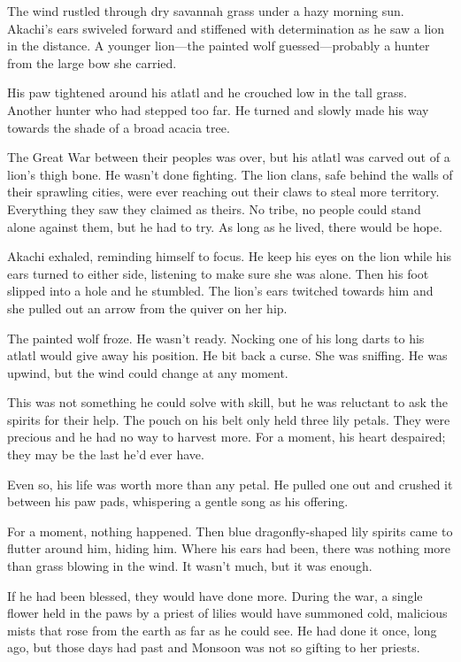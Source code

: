 The wind rustled through dry savannah grass under a hazy morning sun. Akachi's ears swiveled forward and stiffened with determination as he saw a lion in the distance. A younger lion---the painted wolf guessed---probably a hunter from the large bow she carried.

His paw tightened around his atlatl and he crouched low in the tall grass. Another hunter who had stepped too far. He turned and slowly made his way towards the shade of a broad acacia tree.

The Great War between their peoples was over, but his atlatl was carved out of a lion's thigh bone. He wasn't done fighting. The lion clans, safe behind the walls of their sprawling cities, were ever reaching out their claws to steal more territory. Everything they saw they claimed as theirs. No tribe, no people could stand alone against them, but he had to try. As long as he lived, there would be hope.

Akachi exhaled, reminding himself to focus. He keep his eyes on the lion while his ears turned to either side, listening to make sure she was alone. Then his foot slipped into a hole and he stumbled. The lion's ears twitched towards him and she pulled out an arrow from the quiver on her hip.

The painted wolf froze. He wasn't ready. Nocking one of his long darts to his atlatl would give away his position. He bit back a curse. She was sniffing. He was upwind, but the wind could change at any moment.

This was not something he could solve with skill, but he was reluctant to ask the spirits for their help. The pouch on his belt only held three lily petals. They were precious and he had no way to harvest more. For a moment, his heart despaired; they may be the last he'd ever have.

Even so, his life was worth more than any petal. He pulled one out and crushed it between his paw pads, whispering a gentle song as his offering.

For a moment, nothing happened. Then blue dragonfly-shaped lily spirits came to flutter around him, hiding him. Where his ears had been, there was nothing more than grass blowing in the wind. It wasn't much, but it was enough.

If he had been blessed, they would have done more. During the war, a single flower held in the paws by a priest of lilies would have summoned cold, malicious mists that rose from the earth as far as he could see. He had done it once, long ago, but those days had past and Monsoon was not so gifting to her priests.

